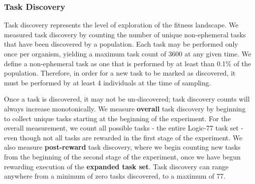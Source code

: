 \documentclass[10pt,letterpaper]{article}
\begin{document}
\subsubsection*{Task Discovery}
Task discovery represents the level of exploration of the fitness landscape. We measured task discovery by counting the number of unique non-ephemeral tasks that have been discovered by a population. Each task may be performed only once per organism, yielding a maximum task count of 3600 at any given time. We define a non-ephemeral task as one that is performed by at least than 0.1\% of the population. 
Therefore, in order for a new task to be marked as discovered, it must be performed by at least 4 individuals at the time of sampling.

Once a task is discovered, it may not be un-discovered; task discovery counts will always increase monotonically. We measure \textbf{overall} task discovery by beginning to collect unique tasks starting at the beginning of the experiment. For the overall measurement, we count all possible tasks - the entire Logic-77 task set - even though not all tasks are rewarded in the first stage of the experiment. We also measure \textbf{post-reward} task discovery, where we begin counting new tasks from the beginning of the second stage of the experiment, once we have begun rewarding execution of the \textbf{expanded task set}. 
Task discovery can range anywhere from a minimum of zero tasks discovered, to a maximum of 77.
\end{document}
